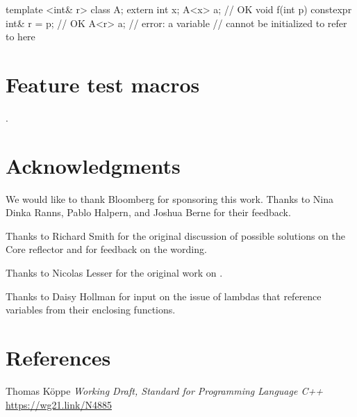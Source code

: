 \documentclass{wg21}
\begin{document}

\begin{addedblock}
\begin{example}
\begin{codeblock}
template <int& r> class A;
extern int x;
A<x> a;  // OK
void f(int p) {
    constexpr int& r = p;  // OK
    A<r> a;                // error: a  variable
                           // cannot be initialized to refer to  here
}
\end{codeblock}
\end{example}
\end{addedblock}

\section{Feature test macros}

.


\section{Acknowledgments}

We would like to thank Bloomberg for sponsoring this work.
Thanks to Nina Dinka Ranns, Pablo Halpern, and Joshua Berne for their feedback.

Thanks to Richard Smith for the original discussion of possible solutions on the Core reflector and for feedback on the wording.

Thanks to Nicolas Lesser for the original work on .

Thanks to Daisy Hollman for input on the issue of lambdas that reference
variables from their enclosing functions.

\section{References}

\renewcommand{\section}[2]{}%



\begin{thebibliography}{9}

Thomas Köppe
\emph{Working Draft, Standard for Programming Language C++}\newline
\url{https://wg21.link/N4885}


\end{thebibliography}
\end{document}
